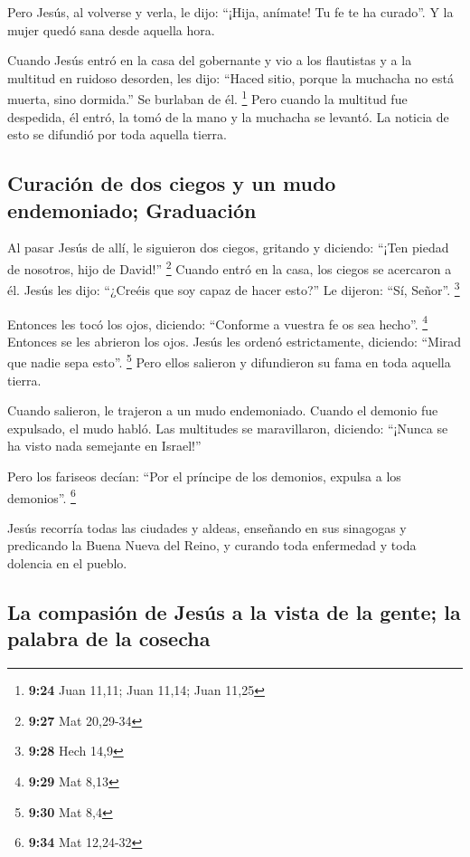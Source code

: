 Pero Jesús, al volverse y verla, le dijo: ``¡Hija,
anímate! Tu fe te ha curado''. Y la mujer quedó sana desde aquella hora.

 Cuando Jesús entró en la casa del gobernante y vio a los
flautistas y a la multitud en ruidoso desorden,  les
dijo: ``Haced sitio, porque la muchacha no está muerta, sino dormida.''
Se burlaban de él. \footnote{\textbf{9:24} Juan 11,11; Juan 11,14; Juan
  11,25}  Pero cuando la multitud fue despedida, él
entró, la tomó de la mano y la muchacha se levantó.  La
noticia de esto se difundió por toda aquella tierra.

\hypertarget{curaciuxf3n-de-dos-ciegos-y-un-mudo-endemoniado-graduaciuxf3n}{%
\subsection{Curación de dos ciegos y un mudo endemoniado;
Graduación}\label{curaciuxf3n-de-dos-ciegos-y-un-mudo-endemoniado-graduaciuxf3n}}

 Al pasar Jesús de allí, le siguieron dos ciegos,
gritando y diciendo: ``¡Ten piedad de nosotros, hijo de David!''
\footnote{\textbf{9:27} Mat 20,29-34}  Cuando entró en la
casa, los ciegos se acercaron a él. Jesús les dijo: ``¿Creéis que soy
capaz de hacer esto?'' Le dijeron: ``Sí, Señor''. \footnote{\textbf{9:28}
  Hech 14,9}

 Entonces les tocó los ojos, diciendo: ``Conforme a
vuestra fe os sea hecho''. \footnote{\textbf{9:29} Mat 8,13}
 Entonces se les abrieron los ojos. Jesús les ordenó
estrictamente, diciendo: ``Mirad que nadie sepa esto''. \footnote{\textbf{9:30}
  Mat 8,4}  Pero ellos salieron y difundieron su fama en
toda aquella tierra.

 Cuando salieron, le trajeron a un mudo endemoniado.
 Cuando el demonio fue expulsado, el mudo habló. Las
multitudes se maravillaron, diciendo: ``¡Nunca se ha visto nada
semejante en Israel!''

 Pero los fariseos decían: ``Por el príncipe de los
demonios, expulsa a los demonios''. \footnote{\textbf{9:34} Mat 12,24-32}

 Jesús recorría todas las ciudades y aldeas, enseñando en
sus sinagogas y predicando la Buena Nueva del Reino, y curando toda
enfermedad y toda dolencia en el pueblo.

\hypertarget{la-compasiuxf3n-de-jesuxfas-a-la-vista-de-la-gente-la-palabra-de-la-cosecha}{%
\subsection{La compasión de Jesús a la vista de la gente; la palabra de
la
cosecha}\label{la-compasiuxf3n-de-jesuxfas-a-la-vista-de-la-gente-la-palabra-de-la-cosecha}}

